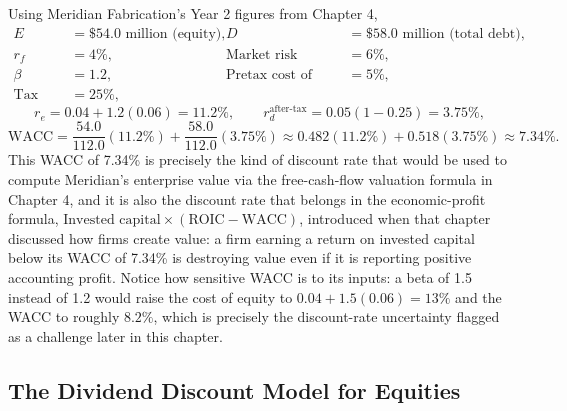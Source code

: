 \documentclass[../ai_in_finance]{subfiles}
\begin{document}
Using Meridian Fabrication's Year 2 figures from Chapter 4,
\begin{align*}
E &= \$54.0 \text{ million (equity)}, & D &= \$58.0 \text{ million (total debt)}, \\
r_f &= 4\%, & \text{Market risk premium} &= 6\%, \\
\beta &= 1.2, & \text{Pretax cost of debt} &= 5\%, \\
\text{Tax rate} &= 25\%, & &
\end{align*}
\begin{equation*}
r_e = 0.04 + 1.2(0.06) = 11.2\%, \qquad r_d^{\text{after-tax}} = 0.05(1-0.25) = 3.75\%,
\end{equation*}
\begin{equation*}
\text{WACC} = \frac{54.0}{112.0}(11.2\%) + \frac{58.0}{112.0}(3.75\%) \approx 0.482(11.2\%) + 0.518(3.75\%) \approx 7.34\%.
\end{equation*}
This WACC of 7.34\% is precisely the kind of discount rate that would be used to compute Meridian's enterprise value via the free-cash-flow valuation formula in Chapter 4, and it is also the discount rate that belongs in the economic-profit formula, $\text{Invested capital} \times (\text{ROIC} - \text{WACC})$, introduced when that chapter discussed how firms create value: a firm earning a return on invested capital below its WACC of 7.34\% is destroying value even if it is reporting positive accounting profit. Notice how sensitive WACC is to its inputs: a beta of 1.5 instead of 1.2 would raise the cost of equity to $0.04+1.5(0.06)=13\%$ and the WACC to roughly $8.2\%$, which is precisely the discount-rate uncertainty flagged as a challenge later in this chapter.

\subsection{The Dividend Discount Model for Equities}
\end{document}
